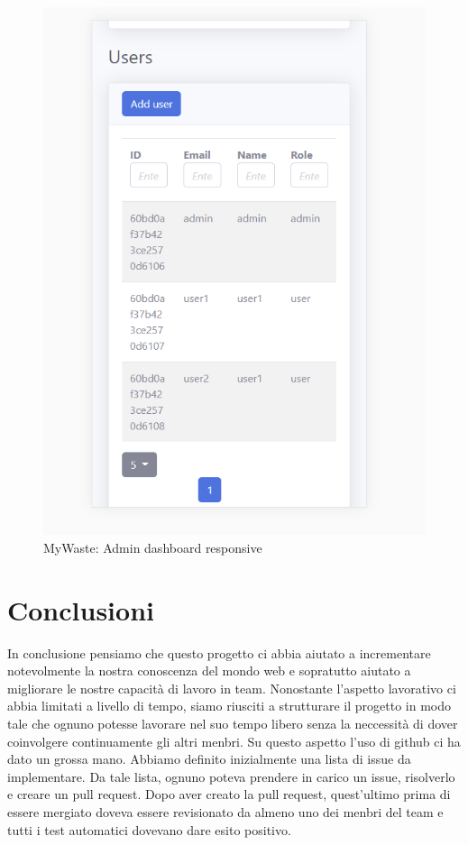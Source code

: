 \documentclass{report}
\begin{document}
\begin{figure}[h!]
    \begin{center}
        \includegraphics[width=1.0\textwidth]{images/adminDashboard_resp3.PNG}  \end{center}
    \caption{MyWaste: Admin dashboard responsive}
    \label{fig: respadmindash3}
\end{figure}


\section{Conclusioni}
In conclusione pensiamo che questo progetto ci abbia aiutato a incrementare notevolmente la nostra conoscenza del mondo web
e sopratutto aiutato a migliorare le nostre capacità di lavoro in team.
Nonostante l'aspetto lavorativo ci abbia limitati a livello di tempo, siamo riusciti a strutturare il progetto in modo tale
che ognuno potesse lavorare nel suo tempo libero senza la neccessità di dover coinvolgere continuamente gli altri menbri.
Su questo aspetto l'uso di github ci ha dato un grossa mano. Abbiamo definito inizialmente una lista di issue da implementare.
Da tale lista, ognuno poteva prendere in carico un issue, risolverlo e creare un pull request. Dopo aver creato la pull request,
quest'ultimo prima di essere mergiato doveva essere revisionato da almeno uno dei menbri del team e tutti i test automatici
dovevano dare esito positivo.


%
%
\end{document}

